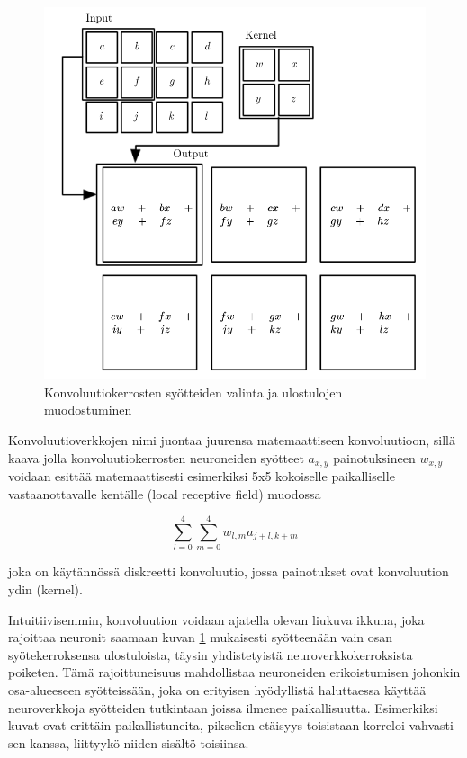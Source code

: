 \documentclass[finnish]{tktltiki2}
\theoremstyle{definition}
\theoremstyle{remark}
\begin{document}
    \begin{figure}[h]
      \centering
      \includegraphics[scale=0.4]{convolution}
      \caption{Konvoluutiokerrosten syötteiden valinta ja ulostulojen muodostuminen \cite{Goodfellow-et-al-2016}}
      \label{pic:convolution}
    \end{figure}

    Konvoluutioverkkojen nimi juontaa juurensa matemaattiseen konvoluutioon, sillä kaava jolla konvoluutiokerrosten neuroneiden syötteet $a_{x,y}$ painotuksineen $w_{x,y}$ voidaan esittää matemaattisesti esimerkiksi 5x5 kokoiselle paikalliselle vastaanottavalle kentälle (local receptive field) muodossa

    $$ \sum_{l=0}^{4}\sum_{m=0}^{4} w_{l,m}a_{j+l,k+m}$$
    
    joka on käytännössä diskreetti konvoluutio, jossa painotukset ovat konvoluution ydin (kernel).

    Intuitiivisemmin, konvoluution voidaan ajatella olevan liukuva ikkuna, joka rajoittaa neuronit saamaan kuvan \ref{pic:convolution} mukaisesti syötteenään vain osan syötekerroksensa ulostuloista, täysin yhdistetyistä neuroverkkokerroksista poiketen. Tämä rajoittuneisuus mahdollistaa neuroneiden erikoistumisen johonkin osa-alueeseen syötteissään, joka on erityisen hyödyllistä haluttaessa käyttää neuroverkkoja syötteiden tutkintaan joissa ilmenee paikallisuutta. Esimerkiksi kuvat ovat erittäin paikallistuneita, pikselien etäisyys toisistaan korreloi vahvasti sen kanssa, liittyykö niiden sisältö toisiinsa.
\end{document}
